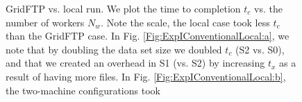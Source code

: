 \documentclass{rspublic}
\begin{document}
\begin{figure}[!ht]
\begin{center}
\caption{GridFTP vs. local run. We plot the time to
completion $t_c$ vs. the number of workers $N_w$. Note the scale, the
local case took less $t_c$ than the GridFTP case. In Fig.
\ref{Fig:ExpIConventionalLocal:a}, we note that by doubling the data set
size we doubled $t_c$ (S2 vs. S0), and that we created an overhead in S1 (vs. S2) by
increasing $t_x$ as a result of having more files. In Fig.
\ref{Fig:ExpIConventionalLocal:b}, the two-machine configurations took
}
\end{center}
\end{figure}
\end{document}

